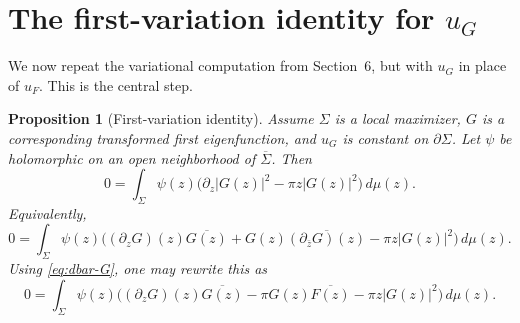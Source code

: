 \documentclass[11pt]{article}
\newtheorem{proposition}[theorem]{Proposition}
\newcommand{\dmu}{\,d\mu}
\newcommand{\pw}{\partial_z}
\newcommand{\pwb}{\partial_{\bar z}}
\newcommand{\1}{\mathbf 1}
\newcommand{\abs}[1]{\left|#1\right|}
\begin{document}
\section{The first-variation identity for \(u_G\)}

We now repeat the variational computation from Section~6, but with \(u_G\) in place of
\(u_F\). This is the central step.

\begin{proposition}[First-variation identity]\label{prop:first-variation}
Assume \(\Sigma\) is a local maximizer, \(G\) is a corresponding transformed first
eigenfunction, and \(u_G\) is constant on \(\partial\Sigma\). Let \(\psi\) be
holomorphic on an open neighborhood of \(\overline\Sigma\). Then
\begin{equation}\label{eq:raw-first-variation}
0
=
\int_\Sigma \psi(z)\Big(\pw\abs{G(z)}^2-\pi z\abs{G(z)}^2\Big)\dmu(z).
\end{equation}
Equivalently,
\begin{equation}\label{eq:expanded-first-variation}
0
=
\int_\Sigma
\psi(z)\Big((\pw G)(z)\overline{G(z)}
+G(z)\overline{(\pwb G)(z)}
-\pi z\abs{G(z)}^2\Big)\dmu(z).
\end{equation}
Using \eqref{eq:dbar-G}, one may rewrite this as
\begin{equation}\label{eq:coupled-first-variation}
0
=
\int_\Sigma
\psi(z)\Big((\pw G)(z)\overline{G(z)}
-\pi G(z)\overline{F(z)}
-\pi z\abs{G(z)}^2\Big)\dmu(z).
\end{equation}
\end{proposition}
\end{document}
